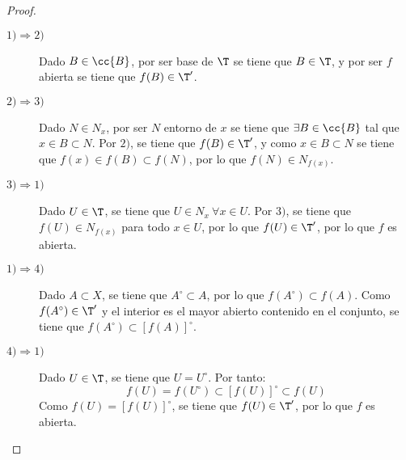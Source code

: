 \begin{proof}~
    \begin{description}
        \item[$1) \Longrightarrow 2)$] Dado $B\in \cc{B}$, por ser base de $\T$ se tiene que $B\in \T$, y por ser $f$ abierta se tiene que $f(B)\in \T'$.
        \item[$2) \Longrightarrow 3)$] Dado $N\in N_x$, por ser $N$ entorno de $x$ se tiene que $\exists B\in \cc{B}$ tal que $x\in B\subset N$.
        Por $2)$, se tiene que $f(B)\in \T'$, y como $x\in B\subset N$ se tiene que $f(x)\in f(B)\subset f(N)$, por lo que $f(N)\in N_{f(x)}$.
        \item[$3) \Longrightarrow 1)$] Dado $U\in \T$, se tiene que $U\in N_x~\forall x\in U$. Por $3)$, se tiene que $f(U)\in N_{f(x)}$ para todo $x\in U$, por lo que $f(U)\in \T'$, por lo que $f$ es abierta.

        \item[$1) \Longrightarrow 4)$] Dado $A\subset X$, se tiene que $A^\circ \subset A$, por lo que $f(A^\circ)\subset f(A)$. Como $f(A^\circ)\in \T'$ y el interior es el mayor abierto contenido en el conjunto, se tiene que $f(A^\circ)\subset [f(A)]^\circ$.
        \item[$4) \Longrightarrow 1)$] Dado $U\in \T$, se tiene que $U=U^\circ$. Por tanto:
        \begin{equation*}
            f(U)=f(U^\circ)\subset [f(U)]^\circ\subset f(U)
        \end{equation*}
        Como $f(U)=[f(U)]^\circ$, se tiene que $f(U)\in \T'$, por lo que $f$ es abierta.
    \end{description}
\end{proof}

